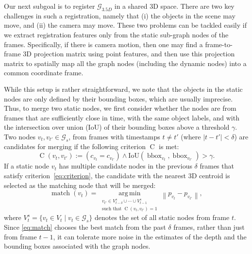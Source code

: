 \documentclass[letterpaper]{article} \usepackage{aaai22}  \usepackage{times}  \usepackage{helvet}  \usepackage{courier}  \usepackage[hyphens]{url}  \usepackage{graphicx} \urlstyle{rm} \def\UrlFont{\rm}  \usepackage{natbib}  \usepackage{caption} \DeclareCaptionStyle{ruled}{labelfont=normalfont,labelsep=colon,strut=off} \frenchspacing  \setlength{\pdfpagewidth}{8.5in}  \setlength{\pdfpageheight}{11in}  \usepackage{algorithm}
\newcommand{\graph}{\mathcal{G}}
\newcommand{\gtf}{\graph_{3.5D}}
\newcommand{\nodes}{V}
\newcommand{\node}{v}
\newcommand{\enorm}[1]{\left\|{#1}\right\|}
\DeclareMathOperator{\argmin}{arg\,min}
\DeclareMathOperator{\bbox}{bbox}
\DeclareMathOperator{\criteria}{C}
\DeclareMathOperator{\match}{match}
\begin{document}
Our next subgoal is to register $\gtf$ in a shared 3D space. There are two key challenges in such a registration, namely that (i) the objects in the scene may move, and (ii) the camera may move. These two problems can be tackled easily if we extract registration features only from the static sub-graph nodes of the frames. Specifically, if there is camera motion, then one may find a frame-to-frame 3D projection matrix using point features, and then use this projection matrix to spatially map all the graph nodes (including the dynamic nodes) into a common coordinate frame. 

While this setup is rather straightforward, we note that the objects in the static nodes are only defined by their bounding boxes, which are usually imprecise. Thus, to merge two static nodes, we first consider whether the nodes are from frames that are sufficiently close in time, with the same object labels, and with the intersection over union (IoU) of their bounding boxes above a threshold $\gamma$. Two nodes  $\node_t,\node_{t'}\in\graph_s$, from frames with timestamps $t\neq t'$ (where $|t-t'|<\delta$) are candidates for merging if the following criterion $\criteria$ is met: \begin{equation}
   \criteria(\node_t, \node_{t'}) \!:=\! \left(c_{\node_t} \!=\! c_{\node_{t'}}\right) 
   \wedge\mathrm{IoU}(\bbox_{\node_t}, \bbox_{\node_{t'}})>\gamma. \label{eq:criterion}
\end{equation}
If a static node $\node_t$ has multiple candidate nodes in the previous $\delta$ frames that satisfy criterion~\eqref{eq:criterion}, the candidate with the nearest 3D centroid is selected as the matching node that will be merged:
\begin{equation}
   \match(\node_t) = \!
   \underset{\begin{array}{c}{\node_{t'} \in \nodes^s_{t-\delta}\cup \cdots \cup\nodes^s_{t-1}} \\ 
   \text{such that }\criteria(\node_t, \node_{t'}) = 1 \end{array}}{\argmin}
   \! \enorm{p_{\node_t} - p_{\node_{t'}}}\! ,
   \label{eq:match}
\end{equation}
where $\nodes^s_t = \{\node_t \in \nodes_t \;|\; \node_t \in \graph_s\}$ denotes the set of all static nodes from frame $t$. Since \eqref{eq:match} chooses the best match from the past $\delta$ frames, rather than just from frame $t-1$, it can tolerate more noise in the estimates of the depth and the bounding boxes associated with the graph nodes. 
\end{document}
